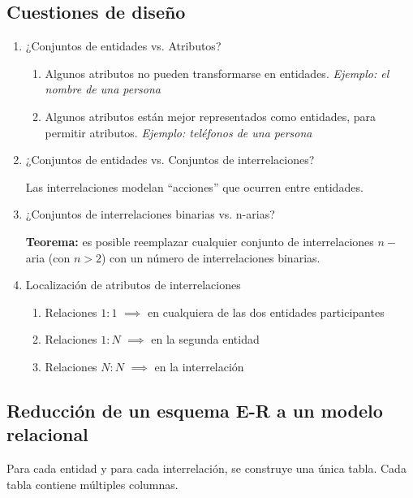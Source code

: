 \documentclass[a4paper, twoside]{article}
\begin{document}
\subsection{Cuestiones de diseño}
\begin{enumerate}
	\item ¿Conjuntos de entidades vs. Atributos?
	\begin{enumerate}
		\item Algunos atributos no pueden transformarse en entidades. \emph{Ejemplo: el nombre de una persona}
		\item Algunos atributos están mejor representados como entidades, para permitir atributos. \emph{Ejemplo: teléfonos de una persona}
	\end{enumerate}

	\item ¿Conjuntos de entidades vs. Conjuntos de interrelaciones?

	Las interrelaciones modelan ``acciones'' que ocurren entre entidades.

	\item ¿Conjuntos de interrelaciones binarias vs. n-arias?

	\textbf{Teorema:} es posible reemplazar cualquier conjunto de interrelaciones $n-$aria (con $n>2$) con un número de interrelaciones binarias.

	\item Localización de atributos de interrelaciones
	\begin{enumerate}
		\item Relaciones $1:1$ $\implies$ en cualquiera de las dos entidades participantes
		\item Relaciones $1:N$ $\implies$ en la segunda entidad
		\item Relaciones $N:N$ $\implies$ en la interrelación
	\end{enumerate}
\end{enumerate}

\subsection{Reducción de un esquema E-R a un modelo relacional}
Para cada entidad y para cada interrelación, se construye una única tabla. Cada tabla contiene múltiples columnas.
\end{document}
